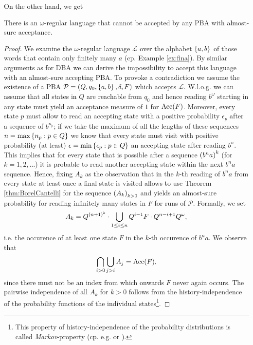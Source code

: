 On the other hand, we get
\begin{lemma}
  \cite[Theorem 4.4.9 (b)]{Groesser}
  There is an $\omega$-regular language that cannot be accepted by any 
  \ac{PBA} with almost-sure acceptance.
  \label{lem:omegaregnotpba}
\end{lemma}
\begin{proof}
  We examine the $\omega$-regular language $\mathcal{L}$ over the alphabet
  $\left\{a,b\right\}$ of those words that contain only finitely many $a$ (cp. Example
  \ref{ex:fina}). By similar arguments as for \ac{DBA} we can derive the
  impossibility to accept this language with an almost-sure accepting 
  \ac{PBA}. To provoke a contradiction we assume the existence of a \ac{PBA}
  $\mathcal{P} = \left(Q, q_{0}, \left\{a,b\right\}, \delta, F\right)$ which accepts 
  $\mathcal{L}$. W.l.o.g. we can assume that all states in $Q$ are reachable
  from $q_{0}$ and hence reading $b^{\omega}$ starting in any state must 
  yield an acceptance measure of $1$ for $\operatorname{Acc}(F)$. Moreover, every state $p$ 
  must allow to read an accepting state with a positive probability 
  $\epsilon_{p}$ after a sequence of $b^{n_{p}}$; if we take the maximum of 
  all the lengths of these sequences $n = \max\left\{n_{p}:p\in Q\right\}$ we know 
  that every state must visit with positive probability (at least) 
  $\epsilon = \min\left\{\epsilon_{p}:p\in Q\right\}$ an accepting state after reading 
  $b^{n}$. This implies that for every state that is possible after a 
  sequence $\left(b^{n}a\right)^{k}$ (for $k = 1, 2, \dots$) it is probable to 
  read another accepting state within the next $b^{n}a$ sequence. Hence, 
  fixing $A_{k}$ as the observation that in the $k$-th reading of $b^{n}a$ 
  from every state at least once a final state is visited allows to use 
  Theorem \ref{thm:BorelCantelli} for the sequence $\left(A_{k}\right)_{k > 0}$ 
  and yields an almost-sure probability for reading infinitely many states in 
  $F$ for runs of $\mathcal{P}$. Formally, we set
  \begin{equation*}
    A_{k} = Q^{\left(n + 1\right)^{k}}\cdot\bigcup_{1\leq i\leq n} Q^{i - 1}F\cdot 
      Q^{n - i + 1} Q^{\omega},
  \end{equation*}
  i.e. the occurence of at least one state $F$ in the $k$-th occurence of 
  $b^{n}a$. We observe that
  \begin{equation*}
    \bigcap_{i > 0}\bigcup_{j > i}A_{j} = \operatorname{Acc}(F),
  \end{equation*}
  since there must not be an index from which onwards $F$ never again occurs.
  The pairwise independence of all $A_{k}$ for $k > 0$ follows from the 
  history-independence of the probability functions of the individual 
  states\footnote{This property of history-independence of the probability 
  distributions is called \emph{Markov}-property (cp. e.g. 
  \cite[Page 8]{Groesser} or \cite[Chapter 17]{Klenke}).}.
\end{proof}

